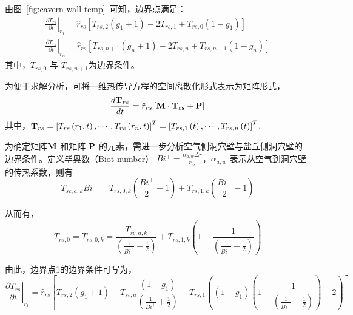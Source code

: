 由图~\ref{fig:cavern-wall-temp}~可知，边界点满足\cite{Cavern-wall-09,Model-AA-CAES-10}：
\begin{subequations}
\begin{gather}
    {\left. {\frac{{\partial {T_{rs}}}}{{\partial t}}} \right|_{{r_1}}} = {\hat r_{rs}}\left[ {{T_{rs,2}}\left( {{g_1} + 1} \right) - 2{T_{rs,1}} + {T_{rs,0}}\left( {1 - {g_1}} \right)} \right]\\
    {\left. {\frac{{\partial {T_{rs}}}}{{\partial t}}} \right|_{{r_n}}} = {\hat r_{rs}}\left[ {{T_{rs,n + 1}}\left( {{g_n} + 1} \right) - 2{T_{rs,n}} + {T_{rs,n - 1}}\left( {1 - {g_n}} \right)} \right]
\end{gather}
\end{subequations}
其中，${T_{rs,0}}$ 与 ${T_{rs,n + 1}}$为边界条件。

为便于求解分析，可将一维热传导方程的空间离散化形式表示为矩阵形式\cite{Model-AA-CAES-10}，
\begin{equation}
\frac{{d{{\bf{T}}_{rs}}}}{{dt}} = {\hat r_{rs}}\left[ {{\bf{M}} \cdot {{\bf{T}}_{{\bf{rs}}}} + {\bf{P}}} \right]
\end{equation}
其中，${{\bf{T}}_{rs}} = {\left[ {{T_{rs}}\left( {{r_1},t} \right), \cdots ,{T_{rs}}\left( {{r_n},t} \right)} \right]^T} = {\left[ {{T_{rs,1}}\left( t \right), \cdots ,{T_{rs,n}}\left( t \right)} \right]^T}$.

为确定矩阵${\bf{M}}$ 和矩阵 ${\bf{P}}$ 的元素，需进一步分析空气侧洞穴壁与盐丘侧洞穴壁的边界条件。定义毕奥数（Biot-number） $B{i^ + } = \frac{{{\alpha _{a,w}}\Delta r}}{{{r_{rs}}}}$，${\alpha _{a,w}}$ 表示从空气到洞穴壁的传热系数，则有\cite{Cavern-wall-09,Model-AA-CAES-10}
\begin{equation}
{T_{sc,a,k}}B{i^ + } = {T_{rs,0,k}}({\frac{{B{i^ + }}}{2} + 1}) + {T_{rs,1,k}}({\frac{{B{i^ + }}}{2} - 1})
\end{equation}

从而有，
\begin{equation}
{T_{rs,0}} = {T_{rs,0,k}} = \frac{{{T_{sc,a,k}}}}{{({\frac{1}{{B{i^ + }}} + \frac{1}{2}})}} + {T_{rs,1,k}}({1 -\frac{1}{{({\frac{1}{{B{i^ + }}} + \frac{1}{2}})}}})
\end{equation}

由此，边界点1的边界条件可写为，
\begin{equation}
{\left. {\frac{{\partial {T_{rs}}}}{{\partial t}}} \right|_{{r_1}}} = {\hat r_{rs}}\left[ {{T_{rs,2}}\left( {{g_1} + 1} \right) + {T_{sc,a}}\frac{{\left( {1 - {g_1}} \right)}}{{\left( {\frac{1}{{B{i^ + }}} + \frac{1}{2}} \right)}} + {T_{rs,1}}({\left( {1 - {g_1}} \right)({1 - \frac{1}{{\left( {\frac{1}{{B{i^ + }}} + \frac{1}{2}} \right)}}}) - 2})} \right]
\end{equation}

